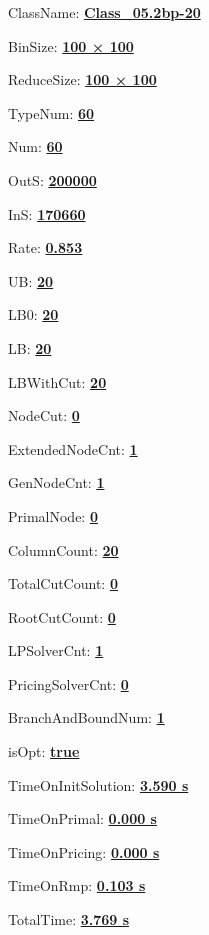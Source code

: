 \documentclass[11pt]{article}
\begin{document}
\pagestyle{empty}


ClassName: \underline{\textbf{Class_05.2bp-20}}
\par
BinSize: \underline{\textbf{100 × 100}}
\par
ReduceSize: \underline{\textbf{100 × 100}}
\par
TypeNum: \underline{\textbf{60}}
\par
Num: \underline{\textbf{60}}
\par
OutS: \underline{\textbf{200000}}
\par
InS: \underline{\textbf{170660}}
\par
Rate: \underline{\textbf{0.853}}
\par
UB: \underline{\textbf{20}}
\par
LB0: \underline{\textbf{20}}
\par
LB: \underline{\textbf{20}}
\par
LBWithCut: \underline{\textbf{20}}
\par
NodeCut: \underline{\textbf{0}}
\par
ExtendedNodeCnt: \underline{\textbf{1}}
\par
GenNodeCnt: \underline{\textbf{1}}
\par
PrimalNode: \underline{\textbf{0}}
\par
ColumnCount: \underline{\textbf{20}}
\par
TotalCutCount: \underline{\textbf{0}}
\par
RootCutCount: \underline{\textbf{0}}
\par
LPSolverCnt: \underline{\textbf{1}}
\par
PricingSolverCnt: \underline{\textbf{0}}
\par
BranchAndBoundNum: \underline{\textbf{1}}
\par
isOpt: \underline{\textbf{true}}
\par
TimeOnInitSolution: \underline{\textbf{3.590 s}}
\par
TimeOnPrimal: \underline{\textbf{0.000 s}}
\par
TimeOnPricing: \underline{\textbf{0.000 s}}
\par
TimeOnRmp: \underline{\textbf{0.103 s}}
\par
TotalTime: \underline{\textbf{3.769 s}}
\par
\newpage


\end{document}
